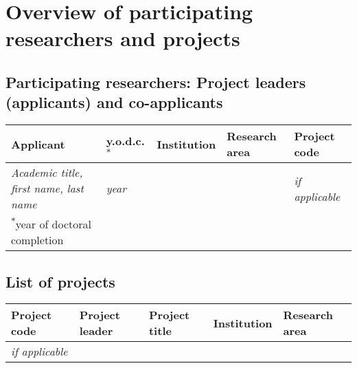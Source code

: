 \documentclass{scrartcl}
\begin{document}
\maketitle

\section{Overview of participating researchers and projects}

\subsection{Participating researchers: Project leaders (applicants) and co-applicants}
%
%

\begin{center}
\footnotesize
\begin{tabular}{lllll}
  Applicant & y.o.d.c.\textsuperscript{$\ast$} & Institution & Research area & Project code \\
  \midrule
  \textit{Academic title, first name, last name} & \textit{year} &  &  & \textit{if applicable} \\
  \bottomrule
  {\scriptsize\textsuperscript{$\ast$}year of doctoral completion}
\end{tabular}
\end{center}


\subsection{List of projects}
%

\begin{center}
\footnotesize
\begin{tabular}{lllll}
  Project code & Project leader & Project title & Institution & Research area\\
  \midrule
  \textit{if applicable} &  &  &  &  \\
  \bottomrule
\end{tabular}
\end{center}
\end{document}
